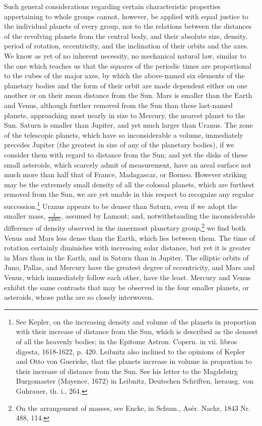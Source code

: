 Such general considerations regarding certain characteristic properties appertaining to whole groups cannot, however, be applied with equal justice to the individual planets of every group, nor to the relations between the distances of the revolving planets from the central body, and their absolute size, density, period of rotation, eccentricity, and the inclination of their orbits and the axes. We know as yet of no inherent necessity, no mechanical natural law, similar to the one which teaches us that the squares of the periodic times are proportional to the cubes of the major axes, by which the above-named six elements of the planetary bodies and the form of their orbit are made dependent either on one another or on their mean distance from the Sun. Mars is smaller than the Earth and Venus, although further removed from the Sun than these last-named planets, approaching most nearly in size to Mercury, the nearest planet to the Sun. Saturn is smaller than Jupiter, and yet much larger than Uranus. The zone of the telescopic planets, which have so inconsiderable a volume, immediately precedes Jupiter (the greatest in size of any of the planetary bodies), if we consider them with regard to distance from the Sun; and yet the disks of these small asteroids, which scarcely admit of measurement, have an areal surface not much more than half that of France, Madagascar, or Borneo. However striking may be the extremely small density of all the colossal planets, which are furthest removed from the Sun, we are yet unable in this respect to recognize any regular succession.\footnote{See Kepler, on the increasing density and volume of the planets in proportion with their increase of distance from the Sun, which is described as the densest of all the heavenly bodies; in the Epitome Astron. Copern. in vii. libros digesta, 1618-1622, p. 420. Leibnitz also inclined to the opinions of Kepler and Otto von Guericke, that the planets increase in volume in proportion to their increase of distance from the Sun. See his letter to the Magdeburg Burgomaster (Mayence, 1672) in Leibnitz, Deutschen Schriften, herausg. von Guhrauer, th. i., 264.} Uranus appears to be denser than Saturn, even if we adopt the smaller mass, $\frac{1}{24005}$, assumed by Lamont; and, notwithstanding the inconsiderable difference of density observed in the innermost planetary group,\footnote{On the arrangement of masses, see Encke, in Schum., As\'{e}r. Nachr, 1843 Nr. 488, 114.} we find both Venus and Mars less dense than the Earth, which lies between them. The time of rotation certainly diminishes with increasing solar distance, but yet it is greater in Mars than in the Earth, and in Saturn than in Jupiter. The elliptic orbits of Juno, Pallas, and Mercury have the greatest degree of eccentricity, and Mars and Venus, which immediately follow each other, have the least. Mercury and Venus exhibit the same contrasts that may be observed in the four smaller planets, or asteroids, whose paths are so closely interwoven.

